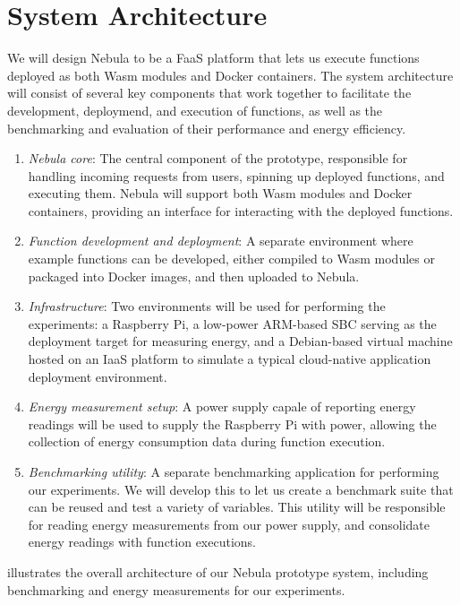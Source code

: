 \documentclass[
  table]{report}
\begin{document}
\section{System Architecture}

We will design Nebula to be a \ac{FaaS} platform that lets us execute
functions deployed as both \ac{Wasm} modules and Docker containers. The
system architecture will consist of several key components that work
together to facilitate the development, deploymend, and execution of
functions, as well as the benchmarking and evaluation of their
performance and energy efficiency.

\begin{enumerate}
\def\labelenumi{\arabic{enumi}.}
\item
  \emph{Nebula core}: The central component of the prototype,
  responsible for handling incoming requests from users, spinning up
  deployed functions, and executing them. Nebula will support both
  \ac{Wasm} modules and Docker containers, providing an interface for
  interacting with the deployed functions.
\item
  \emph{Function development and deployment}: A separate environment
  where example functions can be developed, either compiled to \ac{Wasm}
  modules or packaged into Docker images, and then uploaded to Nebula.
\item
  \emph{Infrastructure}: Two environments will be used for performing
  the experiments: a Raspberry Pi, a low-power ARM-based \ac{SBC}
  serving as the deployment target for measuring energy, and a
  Debian-based virtual machine hosted on an \ac{IaaS} platform to
  simulate a typical cloud-native application deployment environment.
\item
  \emph{Energy measurement setup}: A power supply capale of reporting
  energy readings will be used to supply the Raspberry Pi with power,
  allowing the collection of energy consumption data during function
  execution.
\item
  \emph{Benchmarking utility}: A separate benchmarking application for
  performing our experiments. We will develop this to let us create a
  benchmark suite that can be reused and test a variety of variables.
  This utility will be responsible for reading energy measurements from
  our power supply, and consolidate energy readings with function
  executions.
\end{enumerate}

 illustrates the overall architecture of our
Nebula prototype system, including benchmarking and energy measurements
for our experiments.
\end{document}
